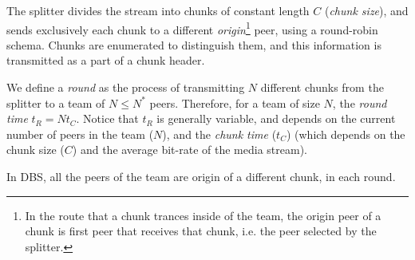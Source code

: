 

\label{sec:feeding_the_team}

The splitter divides the stream into chunks of constant length $C$
(\emph{chunk size}), and sends exclusively each chunk to a different
\emph{origin}\footnote{In the route that a chunk trances inside of the
  team, the origin peer of a chunk is first peer that receives that
  chunk, i.e. the peer selected by the splitter.} peer, using a
round-robin schema. Chunks are enumerated to distinguish them, and this
information is transmitted as a part of a chunk header.

\begin{comment}
More details about the implementation
are available in Fig.~\ref{fig:chunk_generation}.


\begin{figure*}
  \fig{500}{5cm}{DBS_splitter_feed} \caption{Chunk
    generation at the splitter and their transmission to the
    team.\label{fig:chunk_generation}}
\end{figure*}
\end{comment}

We define a \emph{round} as the process of transmitting $N$ different
chunks from the splitter to a team of $N\leq N^*$ peers. Therefore,
for a team of size $N$, the \emph{round time} $t_R=Nt_C$. Notice that
$t_R$ is generally variable, and depends on the current number of
peers in the team ($N$), and the \emph{chunk time} ($t_C$) (which
depends on the chunk size ($C$) and the average bit-rate of the media
stream).

In DBS, all the peers of the team are origin of a different chunk, in
each round.

\begin{comment}
(in a team) as the time necessary to send two consecutive chunks from
  the splitter (of such team) to the same peer, using the
  round-robing. This time is variable and depends on $|T|$, $C$, and
  the average bit-rate of the media, $A$.
\end{comment}

\begin{comment}
The round-time is defined by:
\begin{equation}
  \cal{r} = \cal{c}N.
  \label{eq:round_time}
\end{equation}
For example, if we use only one team of $N=256$ peers, a chunk size
$C=1024$~bytes, and a video of $1$~Mb/s, the round time is
\begin{displaymath}
  \cal{r} = \frac{1024\frac{\text{bytes}}{\text{chunk}}\times
    8\frac{\text{bits}}{\text{byte}}}{10^6\frac{\text{bits}}{\text{second}}}\times
  256 \approx 2.1~\text{seconds}.
\end{displaymath}
\end{comment}
